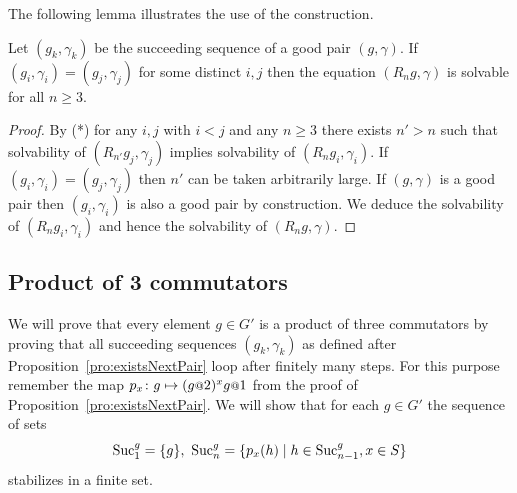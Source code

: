 \documentclass[a4paper,11pt]{amsart}
\begin{document}
  The following lemma illustrates the use of the construction.

  \begin{lem}
  Let $(g_k,\gamma_k)$ be the succeeding sequence of a good pair $(g,\gamma)$. 
  If $(g_i,\gamma_i) = (g_j,\gamma_j)$ for some distinct $i,j$ then the equation $(R_ng,\gamma)$ is solvable for 
  all $n \ge 3$.
  \end{lem}
  \begin{proof}
  By (*) for any $i,j$ with $i < j$ and any $n \ge 3$ there exists $n' > n$ such that solvability of 
  $(R_{n'}g_j,\gamma_j)$ implies solvability of $(R_{n}g_i,\gamma_i)$. If $(g_i,\gamma_i) = (g_j,\gamma_j)$
  then $n'$ can be taken arbitrarily large. If $(g,\gamma)$ is a good pair then $(g_i,\gamma_i)$ is also a good pair
  by construction. We deduce the solvability of $(R_n g_i,\gamma_i)$ and hence the solvability of $(R_n g,\gamma)$.
  \end{proof}

 
 
%  
%  
\subsection{Product of 3 commutators}
We will prove that every element $g\in G'$ is a product of three commutators by proving that all
succeeding sequences $(g_k,\gamma_k)$ as defined after Proposition~\ref{pro:existsNextPair} 
loop after finitely many steps.
For this purpose remember the map $p_x\colon g \mapsto (g\at{2})^x g\at{1}$ from the proof of Proposition~\ref{pro:existsNextPair}.
We will show that for each $g\in G'$ the sequence of sets 
\[\textup{Suc}_1^g=\{g\},\ \textup{Suc}_n^g = \{p_x(h) \mid h\in \textup{Suc}_{n-1}^g, x\in S\} \]
stabilizes in a finite set. 
\end{document}
